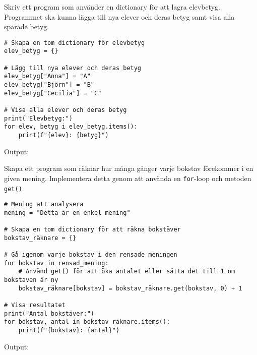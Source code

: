 \begin{exercise}
Skriv ett program som använder en dictionary för att lagra elevbetyg. Programmet ska kunna lägga till nya elever och deras betyg samt visa alla sparade betyg.
\end{exercise}
\begin{solution}
\begin{lstlisting}
# Skapa en tom dictionary för elevbetyg
elev_betyg = {}

# Lägg till nya elever och deras betyg
elev_betyg["Anna"] = "A"
elev_betyg["Björn"] = "B"
elev_betyg["Cecilia"] = "C"

# Visa alla elever och deras betyg
print("Elevbetyg:")
for elev, betyg i elev_betyg.items():
    print(f"{elev}: {betyg}")
\end{lstlisting}
Output:
\end{solution}
\begin{exercise}
Skapa ett program som räknar hur många gånger varje bokstav förekommer i en given mening. 
Implementera detta genom att använda en \texttt{for}-loop och metoden \texttt{get()}.

\end{exercise}
\begin{solution}
\begin{lstlisting}
# Mening att analysera
mening = "Detta är en enkel mening"

# Skapa en tom dictionary för att räkna bokstäver
bokstav_räknare = {}

# Gå igenom varje bokstav i den rensade meningen
for bokstav in rensad_mening:
    # Använd get() för att öka antalet eller sätta det till 1 om bokstaven är ny
    bokstav_räknare[bokstav] = bokstav_räknare.get(bokstav, 0) + 1

# Visa resultatet
print("Antal bokstäver:")
for bokstav, antal in bokstav_räknare.items():
    print(f"{bokstav}: {antal}")
\end{lstlisting}
Output:
\end{solution}

